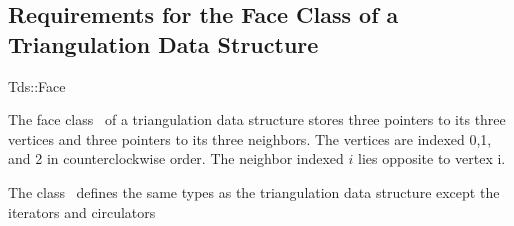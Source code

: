 \subsection{Requirements for the Face  Class of a Triangulation Data Structure}
\label{I1_Sect_Tds_Face}
\begin{ccClass}{Tds::Face}

\ccThreeToTwo

The face class \ccClassName\ of a triangulation data structure
stores three pointers to its three vertices
and three pointers to its three neighbors.
The vertices are indexed 0,1, and 2 in counterclockwise order.
The  neighbor indexed $i$ lies
opposite to vertex i. 

\ccInheritsFrom {}

\ccTypes
The class \ccClassName\ defines the same types as 
the triangulation data structure 
except the iterators and circulators










\end{ccClass}
